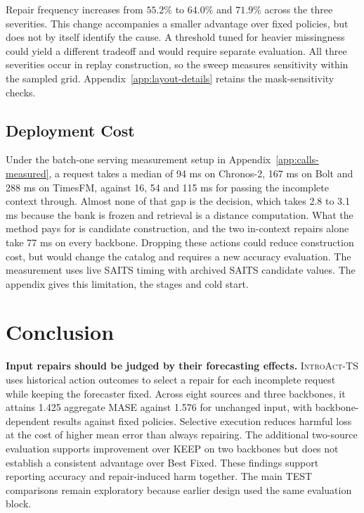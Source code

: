 \documentclass{article}
\newcommand{\introact}{\textsc{IntroAct-TS}}
\begin{document}
Repair frequency increases from $55.2\%$ to $64.0\%$ and $71.9\%$ across the three
severities. This change accompanies a smaller advantage over fixed policies, but does not
by itself identify the cause. A threshold tuned for heavier missingness could yield a
different tradeoff and would require separate evaluation. All three severities occur in
replay construction, so the sweep measures sensitivity within the sampled grid.
Appendix~\ref{app:layout-details} retains the mask-sensitivity checks.

\subsection{Deployment Cost}
\label{sec:exp-cost}
Under the batch-one serving measurement setup in Appendix~\ref{app:calls-measured},
a request takes a median of 94 ms on
Chronos-2, 167 ms on Bolt and 288 ms on TimesFM, against 16, 54 and 115 ms for passing the
incomplete context through. Almost none of that gap is the decision, which takes 2.8 to
3.1 ms because the bank is frozen and retrieval is a distance computation. What the method
pays for is candidate construction, and the two in-context repairs alone take 77 ms on every
backbone. Dropping these actions could reduce construction cost, but would change the catalog and
requires a new accuracy evaluation. The measurement uses live SAITS timing with archived
SAITS candidate values. The appendix gives this limitation, the stages and cold start.

\section{Conclusion}
\label{sec:conclusion}
\textbf{Input repairs should be judged by their forecasting effects.} \introact{} uses
historical action outcomes to select a repair for each incomplete request while keeping the
forecaster fixed. Across eight sources and three backbones, it attains 1.425 aggregate MASE
against 1.576 for unchanged input, with backbone-dependent results against fixed policies.
Selective execution reduces harmful loss at the cost of higher mean error than always
repairing. The additional two-source evaluation supports improvement over KEEP on two
backbones but does not establish a consistent advantage over Best Fixed. These findings
support reporting accuracy and repair-induced harm together. The main TEST comparisons
remain exploratory because earlier design used the same evaluation block.

\label{sec:main-end}
\end{document}
